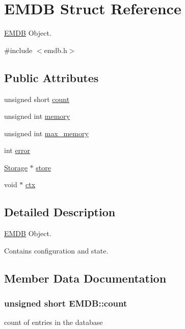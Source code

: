 \hypertarget{struct_e_m_d_b}{}\section{E\+M\+D\+B Struct Reference}
\label{struct_e_m_d_b}


\hyperlink{struct_e_m_d_b}{E\+M\+D\+B} Object.  




{\ttfamily \#include $<$emdb.\+h$>$}

\subsection*{Public Attributes}
\begin{DoxyCompactItemize}
\item 
unsigned short \hyperlink{struct_e_m_d_b_a417ec19fac7385d460dd2a1405d8bb0b}{count}
\item 
unsigned int \hyperlink{struct_e_m_d_b_a660445dd107e08aebc47cf7690565d14}{memory}
\item 
unsigned int \hyperlink{struct_e_m_d_b_ade62d88e06b82b474ce9a05a819c5924}{max\+\_\+memory}
\item 
int \hyperlink{struct_e_m_d_b_a32e49b3af8a306edeb638245a6afffc0}{error}
\item 
\hyperlink{struct_storage}{Storage} $\ast$ \hyperlink{struct_e_m_d_b_a872289fb194a97cf2718c680a7cee154}{store}
\item 
void $\ast$ \hyperlink{struct_e_m_d_b_a726fbe533f115c88e1afb228a9a19116}{ctx}
\end{DoxyCompactItemize}


\subsection{Detailed Description}
\hyperlink{struct_e_m_d_b}{E\+M\+D\+B} Object. 

Contains configuration and state. 

\subsection{Member Data Documentation}
\hypertarget{struct_e_m_d_b_a417ec19fac7385d460dd2a1405d8bb0b}{}
\subsubsection[{count}]{\setlength{\rightskip}{0pt plus 5cm}unsigned short E\+M\+D\+B\+::count}\label{struct_e_m_d_b_a417ec19fac7385d460dd2a1405d8bb0b}
count of entries in the database \hypertarget{struct_e_m_d_b_a726fbe533f115c88e1afb228a9a19116}{}
